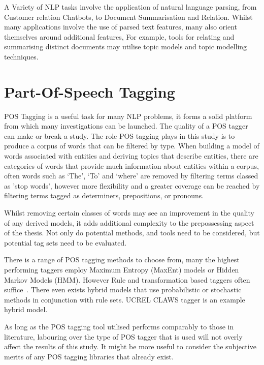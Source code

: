 \documentclass[10pt]{report}
\begin{document}
A Variety of NLP tasks involve the application of natural language parsing, from Customer relation Chatbots, to Document Summarisation and Relation. Whilst many applications involve the use of parsed text features, many also orient themselves around additional features, For example, tools for relating and summarising distinct documents may utilise topic models and topic modelling techniques.


\section{Part-Of-Speech Tagging}
POS Tagging is a useful task for many NLP problems, it forms a solid platform from which many investigations can be launched. The quality of a POS tagger can make or break a study. The role POS tagging plays in this study is to produce a corpus of words that can be filtered by type. When building a model of words associated with entities and deriving topics that describe entities, there are categories of words that provide much information about entities within a corpus, often words such as ‘The’, ‘To’ and ‘where’ are removed by filtering terms classed as 'stop words', however more flexibility and a greater coverage can be reached by filtering terms tagged as determiners, prepositions, or pronouns.

Whilst removing certain classes of words may see an improvement in the quality of any derived models, it adds additional complexity to the prepossessing aspect of the thesis. Not only do potential methods, and tools need to be considered, but potential tag sets need to be evaluated.

There is a range of POS tagging methods to choose from, many the highest performing taggers employ Maximum Entropy (MaxEnt) models or Hidden Markov Models (HMM). However Rule and transformation based taggers often suffice~\cite{Brill1995-sr,Brill1992-hh,Huang2009-xb,Cutting1992-vx}. There even exists hybrid models that use probabilistic or stochastic methods in conjunction with rule sets. UCREL CLAWS tagger is an example hybrid model.~\cite{Leech1994-rh}

As long as the POS tagging tool utilised performs comparably to those in literature, labouring over the type of POS tagger that is used will not overly affect the results of this study. It might be more useful to consider the subjective merits of any POS tagging libraries that already exist.
\end{document}
